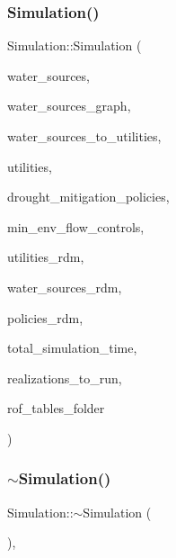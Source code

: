 \subsubsection{\texorpdfstring{Simulation()}{Simulation()}\hspace{0.1cm}{\footnotesize\ttfamily [3/3]}}
{\footnotesize\ttfamily Simulation\+::\+Simulation (\begin{DoxyParamCaption}\item[{vector$<$ \mbox{\hyperlink{classWaterSource}{Water\+Source}} $\ast$$>$ \&}]{water\+\_\+sources,  }\item[{\mbox{\hyperlink{classGraph}{Graph}} \&}]{water\+\_\+sources\+\_\+graph,  }\item[{const vector$<$ vector$<$ int $>$$>$ \&}]{water\+\_\+sources\+\_\+to\+\_\+utilities,  }\item[{vector$<$ \mbox{\hyperlink{classUtility}{Utility}} $\ast$$>$ \&}]{utilities,  }\item[{const vector$<$ \mbox{\hyperlink{classDroughtMitigationPolicy}{Drought\+Mitigation\+Policy}} $\ast$$>$ \&}]{drought\+\_\+mitigation\+\_\+policies,  }\item[{vector$<$ \mbox{\hyperlink{classMinEnvFlowControl}{Min\+Env\+Flow\+Control}} $\ast$$>$ \&}]{min\+\_\+env\+\_\+flow\+\_\+controls,  }\item[{vector$<$ vector$<$ double $>$$>$ \&}]{utilities\+\_\+rdm,  }\item[{vector$<$ vector$<$ double $>$$>$ \&}]{water\+\_\+sources\+\_\+rdm,  }\item[{vector$<$ vector$<$ double $>$$>$ \&}]{policies\+\_\+rdm,  }\item[{const unsigned long}]{total\+\_\+simulation\+\_\+time,  }\item[{vector$<$ unsigned long $>$ \&}]{realizations\+\_\+to\+\_\+run,  }\item[{string \&}]{rof\+\_\+tables\+\_\+folder }\end{DoxyParamCaption})}

\mbox{\label{classSimulation_a80fad3f57dfaf195a36f7bc49bc88279}} 
\subsubsection{\texorpdfstring{$\sim$\+Simulation()}{~Simulation()}}
{\footnotesize\ttfamily Simulation\+::$\sim$\+Simulation (\begin{DoxyParamCaption}{ }\end{DoxyParamCaption})\hspace{0.3cm}{\ttfamily [virtual]}, {\ttfamily [default]}}



